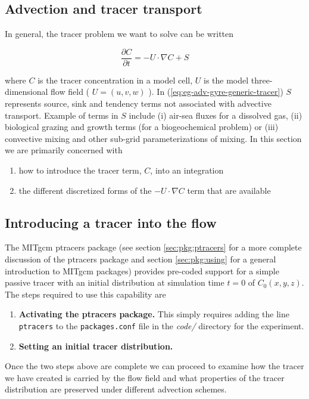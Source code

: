 \subsection{Advection and tracer transport}

In general, the tracer problem we want to solve can be written

\begin{equation}
\label{eq:eg-adv-gyre-generic-tracer}
\frac{\partial C}{\partial t} = -U \cdot \nabla C + S
\end{equation}

where $C$ is the tracer concentration in a model cell, $U$ is the model three-dimensional
flow field ( $U=(u,v,w)$ ). In (\ref{eq:eg-adv-gyre-generic-tracer}) $S$ represents source, sink 
and tendency terms not associated with advective transport. Example of terms in $S$ include
(i) air-sea fluxes for a dissolved gas, (ii) biological grazing and growth terms (for a 
biogeochemical problem) or (iii) convective mixing and other sub-grid parameterizations of 
mixing. In this section we are primarily concerned with 
\begin{enumerate}
\item how to introduce the tracer term, $C$, into an integration
\item the different discretized forms of 
the $-U \cdot \nabla C$ term that are available
\end{enumerate}


\subsection{Introducing a tracer into the flow}

 The MITgcm ptracers package (see section \ref{sec:pkg:ptracers} for a more complete discussion
of the ptracers package and section \ref{sec:pkg:using} for a general introduction to MITgcm 
packages) provides pre-coded support for a simple passive tracer with an initial
distribution at simulation time $t=0$ of $C_0(x,y,z)$. The steps required to use this capability
are 
\begin{enumerate}
\item{\bf Activating the ptracers package.} This simply requires adding the line {\tt ptracers} to
the {\tt packages.conf} file in the {\it code/} directory for the experiment. 
\item{\bf Setting an initial tracer distribution.} 
\end{enumerate}

Once the two steps above are complete we can proceed to examine how the tracer we have created is
carried by the flow field and what properties of the tracer distribution are preserved under
different advection schemes.


